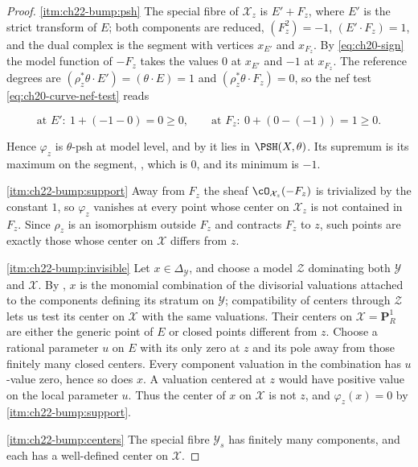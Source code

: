 \begin{proof}
\cref{itm:ch22-bump:psh}  The special fibre of $\mathcal X_z$ is
$E'+F_z$, where $E'$ is the strict transform of $E$; both components
are reduced, $(F_z^2)=-1$, $(E'\cdot F_z)=1$, and the dual complex is
the segment with vertices $x_{E'}$ and $x_{F_z}$.  By
\eqref{eq:ch20-sign} the model function of $-F_z$ takes the values
$0$ at $x_{E'}$ and $-1$ at $x_{F_z}$.  The reference degrees are
$(\rho_z^*\theta\cdot E')=(\theta\cdot E)=1$ and
$(\rho_z^*\theta\cdot F_z)=0$, so the nef test
\eqref{eq:ch20-curve-nef-test} reads

\[
 \text{at }E':\ 1+(-1-0)=0\geq0,
 \qquad
 \text{at }F_z:\ 0+(0-(-1))=1\geq0 .
\]

Hence $\varphi_z$ is $\theta$-psh at model level, and by
 it lies in $\PSH(X,\theta)$.  Its
supremum is its maximum on the segment,
, which is $0$, and its minimum is
$-1$.

\cref{itm:ch22-bump:support}  Away from $F_z$ the sheaf
$\cO_{\mathcal X_z}(-F_z)$ is trivialized by the constant $1$, so
$\varphi_z$ vanishes at every point whose center on $\mathcal X_z$ is
not contained in $F_z$.  Since $\rho_z$ is an isomorphism outside
$F_z$ and contracts $F_z$ to $z$, such points are exactly those whose
center on $\mathcal X$ differs from $z$.

\cref{itm:ch22-bump:invisible}  Let $x\in\Delta_{\mathcal Y}$, and choose
a model $\mathcal Z$ dominating both $\mathcal Y$ and
$\mathcal X$.  By , $x$ is the
monomial combination of the divisorial valuations attached to the
components defining its stratum on $\mathcal Y$; compatibility of centers
through $\mathcal Z$ lets us test its center on $\mathcal X$ with the
same valuations.  Their centers on
$\mathcal X=\mathbf P^1_R$ are either the generic point of $E$ or
closed points different from $z$.  Choose a rational parameter $u$ on
$E$ with its only zero at $z$ and its pole away from those finitely many
closed centers.  Every component valuation in the combination has
$u$-value zero, hence so does $x$.  A valuation centered at $z$ would
have positive value on the local parameter $u$.  Thus the center of
$x$ on $\mathcal X$ is not $z$, and
$\varphi_z(x)=0$ by \cref{itm:ch22-bump:support}.

\cref{itm:ch22-bump:centers}  The special fibre $\mathcal Y_s$ has finitely
many components, and each has a well-defined center on $\mathcal X$.
\end{proof}

